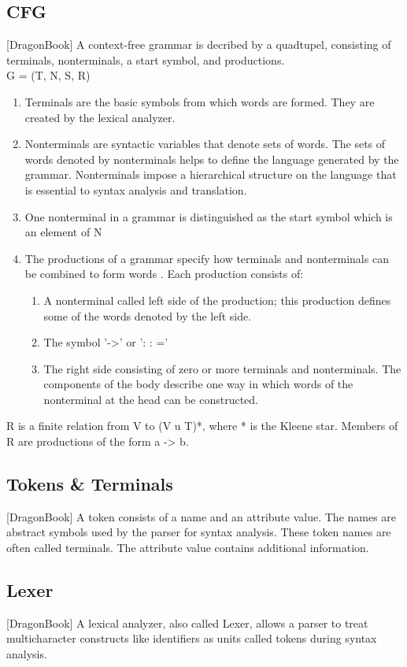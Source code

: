\subsection{CFG} [DragonBook]
A context-free grammar is decribed by a quadtupel, consisting of terminals, nonterminals, a start symbol, and productions. \\
G = (T, N, S, R)\\
\begin{enumerate}
	\item Terminals are the basic symbols from which words are formed.  They are created by the lexical analyzer.
	\item Nonterminals are syntactic variables that denote sets of words. The sets of words denoted by nonterminals helps to define the language generated by the grammar. Nonterminals impose a hierarchical structure on the language that is essential to syntax analysis and translation.
	\item One nonterminal in a grammar is distinguished as the start symbol which is an element of N
	\item The productions of a grammar specify how terminals and nonterminals can be combined to form words . Each production consists of:
	\begin{enumerate}
		\item A nonterminal called left side of the production; this production defines some of the words denoted by the left side.
		\item The symbol '->'  or  ': : =' 
		\item The right side consisting of zero or more terminals and nonterminals. The components of the body describe one way in which words of the nonterminal at the head can be constructed.
	\end{enumerate}
\end{enumerate}
 R is a finite relation from V to (V u T)*, where * is the Kleene star. Members of R are productions of the form a -> b.


\subsection{Tokens \& Terminals}  [DragonBook]
A token consists of a name and an attribute value. The names are abstract symbols used by the parser for syntax analysis. These token names are often called terminals. The attribute value contains additional information.


\subsection{Lexer} [DragonBook]
A lexical analyzer, also called Lexer, allows a parser to treat multicharacter constructs like identifiers as units called tokens during syntax analysis.

